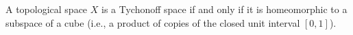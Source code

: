 A topological space $X$ is a Tychonoff space if and only if it is homeomorphic to a subspace of a cube (i.e., a product of copies of the closed unit interval $[0,1]$).
